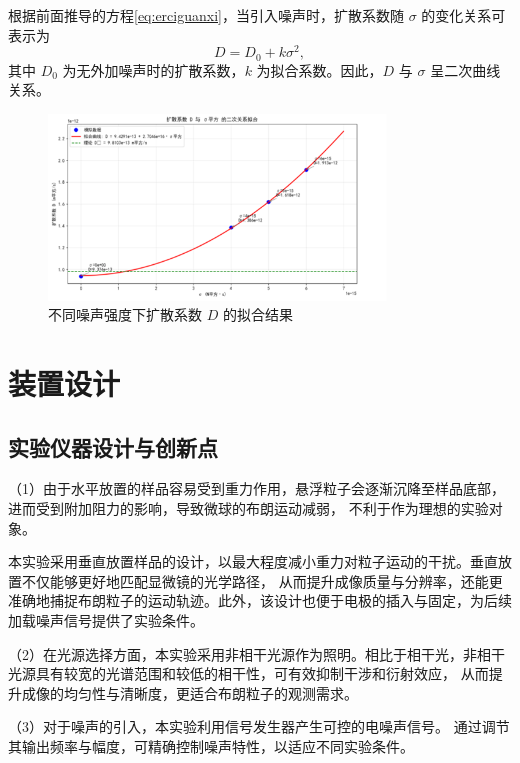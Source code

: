 \documentclass[a4paper]{report} %
\begin{document}
根据前面推导的方程\eqref{eq:erciguanxi}，当引入噪声时，扩散系数随 $\sigma$ 的变化关系可表示为
\begin{equation}
  D = D_0 + k\sigma^2,
  \label{eq:D_sigma}
\end{equation}
其中 $D_0$ 为无外加噪声时的扩散系数，$k$ 为拟合系数。因此，$D$ 与 $\sigma$ 呈二次曲线关系。

\begin{figure}[H]
  \centering
  \includegraphics[width=0.8\textwidth]{fit.png}
  \caption{不同噪声强度下扩散系数 $D$ 的拟合结果}
  \label{fig:fit}
\end{figure}


\chapter{装置设计}
\section{实验仪器设计与创新点}
（1）由于水平放置的样品容易受到重力作用，悬浮粒子会逐渐沉降至样品底部，进而受到附加阻力的影响，导致微球的布朗运动减弱，
不利于作为理想的实验对象\cite{einstein1905,dhont1996brownian}。\par
本实验采用垂直放置样品的设计，以最大程度减小重力对粒子运动的干扰。垂直放置不仅能够更好地匹配显微镜的光学路径，
从而提升成像质量与分辨率，还能更准确地捕捉布朗粒子的运动轨迹。此外，该设计也便于电极的插入与固定，为后续加载噪声信号提供了实验条件。\par

（2）在光源选择方面，本实验采用非相干光源作为照明。相比于相干光，非相干光源具有较宽的光谱范围和较低的相干性，可有效抑制干涉和衍射效应，
从而提升成像的均匀性与清晰度，更适合布朗粒子的观测需求\cite{goodman,mandel1995optical}。\par

（3）对于噪声的引入，本实验利用信号发生器产生可控的电噪声信号。
通过调节其输出频率与幅度，可精确控制噪声特性，以适应不同实验条件\cite{horowitz1989art,schreiber1999electrical}。
\end{document}
